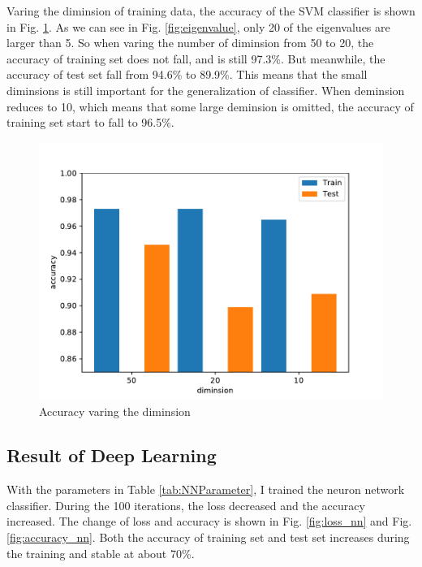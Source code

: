 \documentclass[sigchi]{acmart}
\begin{document}
Varing the diminsion of training data, the accuracy of the SVM classifier is shown in Fig. \ref{fig:accuracy}. As we can see in Fig. \ref{fig:eigenvalue}, only 20 of the eigenvalues are larger than 5. So when varing the number of  diminsion from 50 to 20, the accuracy of training set does not fall, and is still 97.3\%. But meanwhile, the accuracy of test set fall from 94.6\% to 89.9\%. This means that the small diminsions is still important for the generalization of classifier. When deminsion reduces to 10, which means that some large deminsion is omitted, the accuracy of training set start to fall to 96.5\%.

\begin{figure}[h]
  \centering
  \includegraphics[width=\linewidth]{figures/accuracy.pdf}
  \caption{Accuracy varing the diminsion}
  \label{fig:accuracy}
\end{figure}
\subsection{Result of Deep Learning}

With the parameters in Table \ref{tab:NNParameter}, I trained the neuron network classifier. During the 100 iterations, the loss decreased and the accuracy increased. The change of loss and accuracy is shown in Fig. \ref{fig:loss_nn} and Fig. \ref{fig:accuracy_nn}. Both the accuracy of training set and test set increases during the training and stable at about 70\%.
\end{document}
